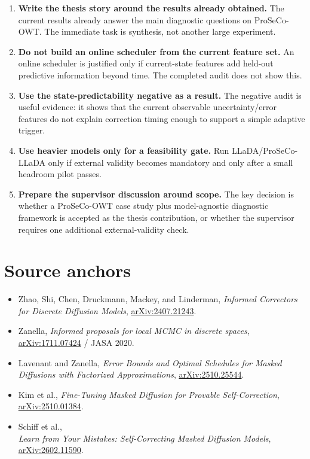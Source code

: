 \documentclass[11pt]{article}
\begin{document}
\begin{enumerate}
\item \textbf{Write the thesis story around the results already obtained.}
The current results already answer the main diagnostic questions on
ProSeCo-OWT.  The immediate task is synthesis, not another large experiment.
\item \textbf{Do not build an online scheduler from the current feature set.}
An online scheduler is justified only if current-state features add held-out
predictive information beyond time.  The completed audit does not show this.
\item \textbf{Use the state-predictability negative as a result.}
The negative audit is useful evidence: it shows that the current observable
uncertainty/error features do not explain correction timing enough to support
a simple adaptive trigger.
\item \textbf{Use heavier models only for a feasibility gate.}
Run LLaDA/ProSeCo-LLaDA only if external validity becomes mandatory and only
after a small headroom pilot passes.
\item \textbf{Prepare the supervisor discussion around scope.}
The key decision is whether a ProSeCo-OWT case study plus model-agnostic
diagnostic framework is accepted as the thesis contribution, or whether the
supervisor requires one additional external-validity check.
\end{enumerate}

\section*{Source anchors}

\begin{itemize}
\item Zhao, Shi, Chen, Druckmann, Mackey, and Linderman,
\emph{Informed Correctors for Discrete Diffusion Models},
\href{https://arxiv.org/abs/2407.21243}{arXiv:2407.21243}.
\item Zanella, \emph{Informed proposals for local MCMC in discrete spaces},
\href{https://arxiv.org/abs/1711.07424}{arXiv:1711.07424} / JASA 2020.
\item Lavenant and Zanella,
\emph{Error Bounds and Optimal Schedules for Masked Diffusions with Factorized
Approximations},
\href{https://arxiv.org/abs/2510.25544}{arXiv:2510.25544}.
\item Kim et al.,
\emph{Fine-Tuning Masked Diffusion for Provable Self-Correction},
\href{https://arxiv.org/abs/2510.01384}{arXiv:2510.01384}.
\item Schiff et al.,\\
\emph{Learn from Your Mistakes: Self-Correcting Masked Diffusion Models},\\
\href{https://arxiv.org/abs/2602.11590}{arXiv:2602.11590}.
\end{itemize}
\end{document}
